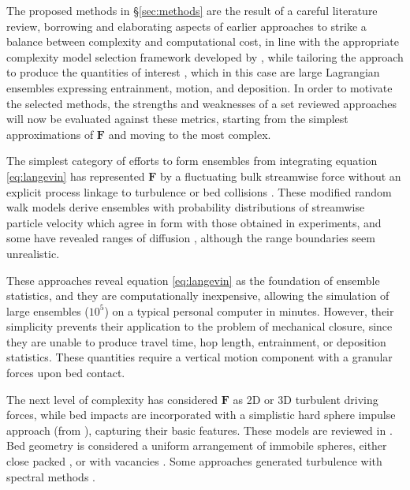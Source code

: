 The proposed methods in \S \ref{sec:methods} are the result of a careful literature review, borrowing and elaborating aspects of earlier approaches to strike a balance between complexity and computational cost, in line with the appropriate complexity model selection framework developed by \cite{Larsen2016}, while tailoring the approach to produce the quantities of interest \citep{Murray2003}, which in this case are large Lagrangian ensembles expressing entrainment, motion, and deposition. In order to motivate the selected methods, the strengths and weaknesses of a set reviewed approaches will now be evaluated against these metrics, starting from the simplest approximations of $\textbf{F}$ and moving to the most complex.   
\bigskip 

The simplest category of efforts to form ensembles from integrating equation \ref{eq:langevin} has represented $\textbf{F}$ by a fluctuating bulk streamwise force without an explicit process linkage to turbulence or bed collisions \citep{Zhang2012, Ancey2014,Fan2014,Fan2016}. These modified random walk models derive ensembles with probability distributions of streamwise particle velocity which agree in form with those obtained in experiments, and some have revealed ranges of diffusion \citep{Zhang2012,Fan2016}, although the range boundaries seem unrealistic. 
\bigskip 

These approaches reveal equation \ref{eq:langevin} as the foundation of ensemble statistics, and they are computationally inexpensive, allowing the simulation of large ensembles ($10^5$) on a typical personal computer in minutes. However, their simplicity prevents their application to the problem of mechanical closure, since they are unable to produce travel time, hop length, entrainment, or deposition statistics. These quantities require a vertical motion component with a granular forces upon bed contact. 
\bigskip 

The next level of complexity has considered $\textbf{F}$ as 2D or 3D turbulent driving forces, while bed impacts are incorporated with a simplistic hard sphere impulse approach (from \citep{Crowe1998}), capturing their basic features. These models are reviewed in \cite{Bialik2015a}. Bed geometry is considered a uniform arrangement of immobile spheres, either close packed \citep{Bialik2010,Bombardelli2010,Bialik2012,Moreno2012, Bialik2013,Bialik2015}, or with vacancies \citep{Kharlamova2015}. Some approaches generated turbulence with spectral methods \citep[e.g.][]{Bialik2012}. 
\bigskip 


